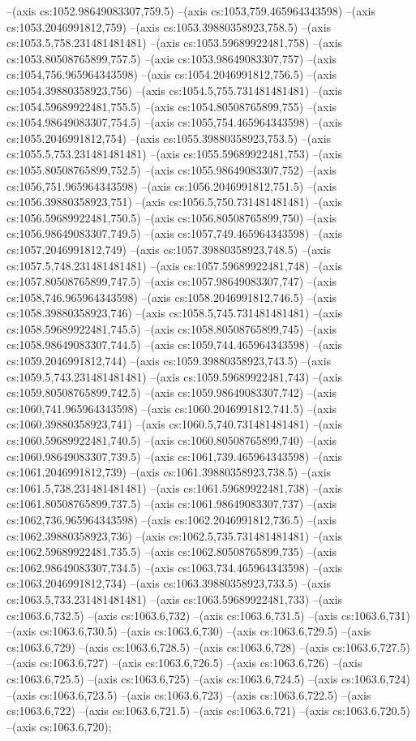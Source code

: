 --(axis cs:1052.98649083307,759.5)
--(axis cs:1053,759.465964343598)
--(axis cs:1053.2046991812,759)
--(axis cs:1053.39880358923,758.5)
--(axis cs:1053.5,758.231481481481)
--(axis cs:1053.59689922481,758)
--(axis cs:1053.80508765899,757.5)
--(axis cs:1053.98649083307,757)
--(axis cs:1054,756.965964343598)
--(axis cs:1054.2046991812,756.5)
--(axis cs:1054.39880358923,756)
--(axis cs:1054.5,755.731481481481)
--(axis cs:1054.59689922481,755.5)
--(axis cs:1054.80508765899,755)
--(axis cs:1054.98649083307,754.5)
--(axis cs:1055,754.465964343598)
--(axis cs:1055.2046991812,754)
--(axis cs:1055.39880358923,753.5)
--(axis cs:1055.5,753.231481481481)
--(axis cs:1055.59689922481,753)
--(axis cs:1055.80508765899,752.5)
--(axis cs:1055.98649083307,752)
--(axis cs:1056,751.965964343598)
--(axis cs:1056.2046991812,751.5)
--(axis cs:1056.39880358923,751)
--(axis cs:1056.5,750.731481481481)
--(axis cs:1056.59689922481,750.5)
--(axis cs:1056.80508765899,750)
--(axis cs:1056.98649083307,749.5)
--(axis cs:1057,749.465964343598)
--(axis cs:1057.2046991812,749)
--(axis cs:1057.39880358923,748.5)
--(axis cs:1057.5,748.231481481481)
--(axis cs:1057.59689922481,748)
--(axis cs:1057.80508765899,747.5)
--(axis cs:1057.98649083307,747)
--(axis cs:1058,746.965964343598)
--(axis cs:1058.2046991812,746.5)
--(axis cs:1058.39880358923,746)
--(axis cs:1058.5,745.731481481481)
--(axis cs:1058.59689922481,745.5)
--(axis cs:1058.80508765899,745)
--(axis cs:1058.98649083307,744.5)
--(axis cs:1059,744.465964343598)
--(axis cs:1059.2046991812,744)
--(axis cs:1059.39880358923,743.5)
--(axis cs:1059.5,743.231481481481)
--(axis cs:1059.59689922481,743)
--(axis cs:1059.80508765899,742.5)
--(axis cs:1059.98649083307,742)
--(axis cs:1060,741.965964343598)
--(axis cs:1060.2046991812,741.5)
--(axis cs:1060.39880358923,741)
--(axis cs:1060.5,740.731481481481)
--(axis cs:1060.59689922481,740.5)
--(axis cs:1060.80508765899,740)
--(axis cs:1060.98649083307,739.5)
--(axis cs:1061,739.465964343598)
--(axis cs:1061.2046991812,739)
--(axis cs:1061.39880358923,738.5)
--(axis cs:1061.5,738.231481481481)
--(axis cs:1061.59689922481,738)
--(axis cs:1061.80508765899,737.5)
--(axis cs:1061.98649083307,737)
--(axis cs:1062,736.965964343598)
--(axis cs:1062.2046991812,736.5)
--(axis cs:1062.39880358923,736)
--(axis cs:1062.5,735.731481481481)
--(axis cs:1062.59689922481,735.5)
--(axis cs:1062.80508765899,735)
--(axis cs:1062.98649083307,734.5)
--(axis cs:1063,734.465964343598)
--(axis cs:1063.2046991812,734)
--(axis cs:1063.39880358923,733.5)
--(axis cs:1063.5,733.231481481481)
--(axis cs:1063.59689922481,733)
--(axis cs:1063.6,732.5)
--(axis cs:1063.6,732)
--(axis cs:1063.6,731.5)
--(axis cs:1063.6,731)
--(axis cs:1063.6,730.5)
--(axis cs:1063.6,730)
--(axis cs:1063.6,729.5)
--(axis cs:1063.6,729)
--(axis cs:1063.6,728.5)
--(axis cs:1063.6,728)
--(axis cs:1063.6,727.5)
--(axis cs:1063.6,727)
--(axis cs:1063.6,726.5)
--(axis cs:1063.6,726)
--(axis cs:1063.6,725.5)
--(axis cs:1063.6,725)
--(axis cs:1063.6,724.5)
--(axis cs:1063.6,724)
--(axis cs:1063.6,723.5)
--(axis cs:1063.6,723)
--(axis cs:1063.6,722.5)
--(axis cs:1063.6,722)
--(axis cs:1063.6,721.5)
--(axis cs:1063.6,721)
--(axis cs:1063.6,720.5)
--(axis cs:1063.6,720);
